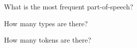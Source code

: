 \documentclass[addpoints]{exam}
\begin{document}
\begin{questions}
        \question[1] What is the most frequent part-of-speech? \hrulefill
        \parbox{0.45\linewidth}{
          \question[1] How many types are there? \hrulefill
        }
        \hspace{0.1\linewidth}
        \parbox{0.45\linewidth}{
          \question[1] How many tokens are there? \hrulefill
        }

  \end{questions}

  \vspace{1.25cm}

  \begin{center}
    \gradetable[v][pages]
  \end{center}
\end{document}
